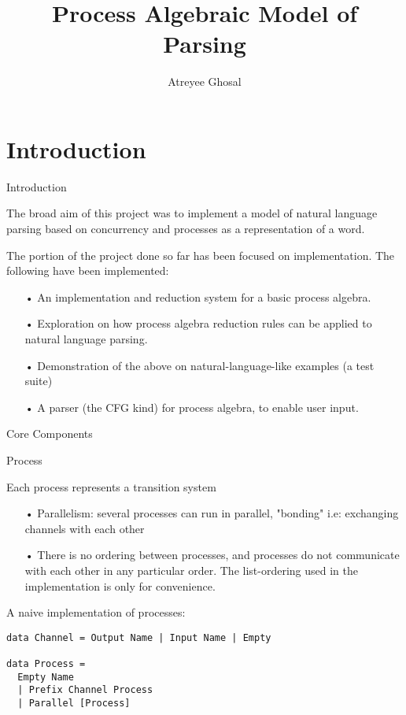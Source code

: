 \documentclass{article}
\title[Process Algebra Parsing]{Process Algebraic Model of Parsing}
\author{Atreyee Ghosal}
\institute{20161167}
\begin{document}
\begin{titlepage}
\maketitle
\end{titlepage}

\section{Introduction}

\begin{frame}{Introduction}

The broad aim of this project was to implement a model of natural language parsing based on concurrency and processes as a representation of a word.

The portion of the project done so far has been focused on implementation. The following have been implemented:

\begin{itemize}
\item[•]
An implementation and reduction system for a basic process algebra.
\item[•]
Exploration on how process algebra reduction rules can be applied to natural language parsing.
\item[•]
Demonstration of the above on natural-language-like examples (a test suite)
\item[•]
A parser (the CFG kind) for process algebra, to enable user input.
\end{itemize}
 
\end{frame}


\begin{frame}[fragile]{Core Components}

\begin{block}{Process}

Each process represents a transition system

\begin{itemize}
\item[•]
Parallelism: several processes can run in parallel, "bonding" i.e: exchanging channels with each other
\item[•]
There is no ordering between processes, and processes do not communicate with each other in any particular order. The list-ordering used in the implementation is only for convenience.
\end{itemize}

A naive implementation of processes: 

\begin{lstlisting}
data Channel = Output Name | Input Name | Empty

data Process =
  Empty Name
  | Prefix Channel Process
  | Parallel [Process]
\end{lstlisting}

\end{block}

\end{frame}
\end{document}

